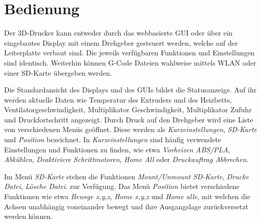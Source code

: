 \clearpage
\section{Bedienung}\label{sec:Bedienung}
Der 3D-Drucker kann entweder durch das webbasierte GUI oder über ein eingebautes Display mit einem Drehgeber gesteuert werden, welche auf der Leiterplatte verbaut sind. Die jeweils verfügbaren Funktionen und Einstellungen sind identisch. Weiterhin können G-Code Dateien wahlweise mittels WLAN oder einer SD-Karte übergeben werden. 

Die Standardansicht des Displays und des GUIs bildet die Statusanzeige. Auf ihr werden aktuelle Daten wie Temperatur des Extruders und des Heizbetts, Ventilatorgeschwindigkeit, Multiplikator Geschwindigkeit, Multiplikator Zufuhr und Druckfortschritt angezeigt. Durch Druck auf den Drehgeber wird eine Liste von verschiedenen Menüs geöffnet. Diese werden als \textit{Kurzeinstellungen}, \textit{SD-Karte} und \textit{Position} bezeichnet. In \textit{Kurzeinstellungen} sind häufig verwendete Einstellungen und Funktionen zu finden, wie etwa \textit{Vorheizen ABS/PLA}, \textit{Abkühlen}, \textit{Deaktiviere Schrittmotoren}, \textit{Home All} oder \textit{Druckauftrag Abbrechen}. 

Im Menü \textit{SD-Karte} stehen die Funktionen  \textit{Mount/Unmount SD-Karte}, \textit{Drucke Datei}, \textit{Lösche Datei}. zur Verfügung. Das Menü \textit{Position} bietet verschiedene Funktionen wie etwa \textit{Bewege x,y,z}, \textit{Home x,y,z} und \textit{Home alle}, mit welchen die Achsen unabhängig voneinander bewegt und ihre Ausgangslage zurückversetzt werden können.